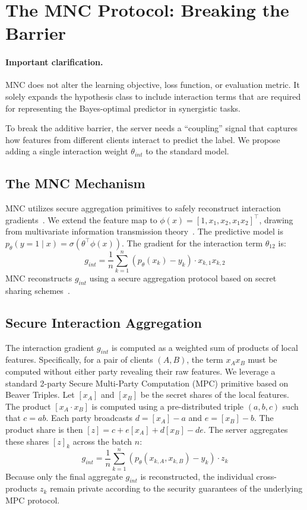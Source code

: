 \documentclass{article}
\theoremstyle{plain}
\theoremstyle{definition}
\begin{document}
\section{The MNC Protocol: Breaking the Barrier}
\label{sec:mnc}

\paragraph{Important clarification.}
MNC does not alter the learning objective, loss function, or evaluation metric. It solely expands the hypothesis class to include interaction terms that are required for representing the Bayes-optimal predictor in synergistic tasks.

To break the additive barrier, the server needs a ``coupling'' signal that captures how features from different clients interact to predict the label. We propose adding a single interaction weight $\theta_{int}$ to the standard model.

\subsection{The MNC Mechanism}
MNC utilizes secure aggregation primitives to safely reconstruct interaction gradients~\cite{bonawitz2017secureagg,fan2024secureagg,chen2024multiparty,cheng2021secureboost}. We extend the feature map to $\phi(x) = [1, x_1, x_2, x_1x_2]^\top$, drawing from multivariate information transmission theory~\cite{shannon1948,mcgill1954interaction}.
The predictive model is $p_\theta(y=1 \mid x) = \sigma(\theta^\top \phi(x))$.
The gradient for the interaction term $\theta_{12}$ is:
\begin{equation}
    g_{int} = \frac{1}{n} \sum_{k=1}^n (p_\theta(x_k) - y_k) \cdot x_{k,1}x_{k,2}
\end{equation}
MNC reconstructs $g_{int}$ using a secure aggregation protocol based on secret sharing schemes~\cite{shamir1979sss,beaver1991triples,zhang2013lowerbounds}.

\subsection{Secure Interaction Aggregation}
The interaction gradient $g_{int}$ is computed as a weighted sum of products of local features. Specifically, for a pair of clients $(A, B)$, the term $x_A x_B$ must be computed without either party revealing their raw features. We leverage a standard 2-party Secure Multi-Party Computation (MPC) primitive based on Beaver Triples.
Let $[x_A]$ and $[x_B]$ be the secret shares of the local features. The product $[x_A \cdot x_B]$ is computed using a pre-distributed triple $(a, b, c)$ such that $c = ab$. Each party broadcasts $d = [x_A] - a$ and $e = [x_B] - b$. The product share is then $[z] = c + e[x_A] + d[x_B] - de$.
The server aggregates these shares $[z]_k$ across the batch $n$:
\begin{equation}
    g_{int} = \frac{1}{n} \sum_{k=1}^n (p_\theta(x_{k,A}, x_{k,B}) - y_k) \cdot z_k
\end{equation}
Because only the final aggregate $g_{int}$ is reconstructed, the individual cross-products $z_k$ remain private according to the security guarantees of the underlying MPC protocol.
\end{document}
